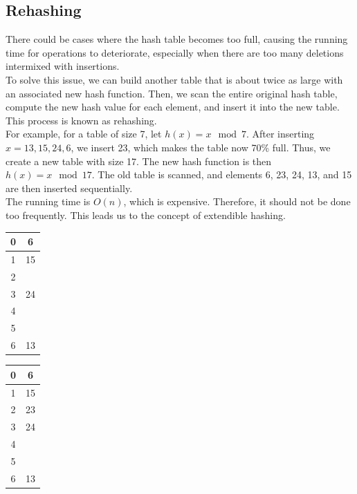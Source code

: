 \subsection{Rehashing}
\begin{minipage}{0.55\textwidth}
There could be cases where the hash table becomes too full, causing the running time for operations to deteriorate, especially when there are too many deletions intermixed with insertions. \\[5pt]
To solve this issue, we can build another table that is about twice as large with an associated new hash function. Then, we scan the entire original hash table, compute the new hash value for each element, and insert it into the new table. This process is known as rehashing. \\[5pt]
For example, for a table of size 7, let \(h(x) = x \mod 7\). After inserting \(x = 13, 15, 24, 6\), we insert 23, which makes the table now 70\% full. Thus, we create a new table with size 17. The new hash function is then \(h(x) = x \mod 17\). The old table is scanned, and elements 6, 23, 24, 13, and 15 are then inserted sequentially. \\[5pt]
The running time is \(O(n)\), which is expensive. Therefore, it should not be done too frequently. This leads us to the concept of extendible hashing.
\end{minipage}
\begin{minipage}{0.15\textwidth}
\begin{table}[H]
  \centering
  \begin{tabular}{|c|c|}
    \hline
      0 & 6 \\ \hline
      1 & 15 \\ \hline
      2 &  \\ \hline
      3 & 24 \\ \hline
      4 &  \\ \hline
      5 &  \\ \hline
      6 & 13 \\ \hline
  \end{tabular}
\end{table}
\end{minipage}
\begin{minipage}{0.15\textwidth}
\begin{table}[H]
  \centering
  \begin{tabular}{|c|c|}
    \hline
      0 & 6 \\ \hline
      1 & 15 \\ \hline
      2 & 23 \\ \hline
      3 & 24 \\ \hline
      4 &  \\ \hline
      5 &  \\ \hline
      6 & 13 \\ \hline
  \end{tabular}
\end{table}
\end{minipage}
